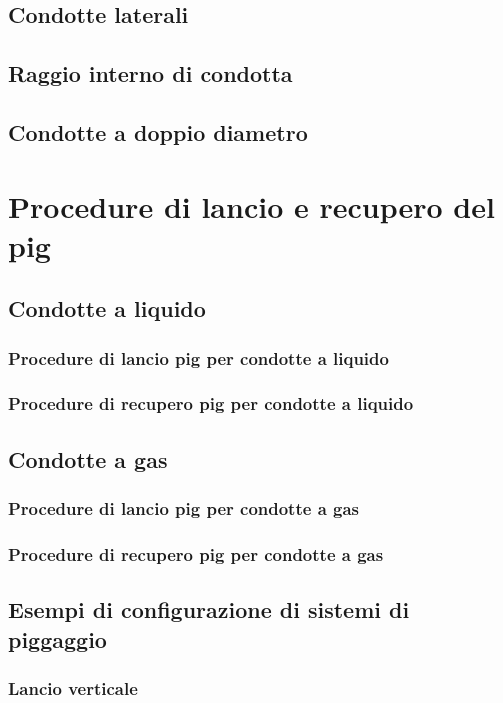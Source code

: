 \subsection{Condotte laterali}
\subsection{Raggio interno di condotta}
\subsection{Condotte a doppio diametro}


\section{Procedure di lancio e recupero del pig}

\subsection{Condotte a liquido}
\subsubsection{Procedure di lancio pig per condotte a liquido}
\subsubsection{Procedure di recupero pig per condotte a liquido}

\subsection{Condotte a gas}
\subsubsection{Procedure di lancio pig per condotte a gas}
\subsubsection{Procedure di recupero pig per condotte a gas}

\subsection{Esempi di configurazione di sistemi di piggaggio}
\subsubsection{Lancio verticale}
